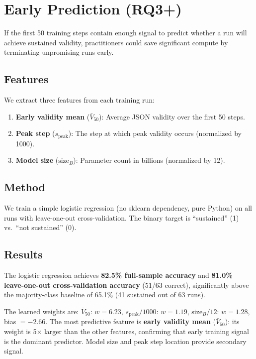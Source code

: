\documentclass[11pt]{article}
\begin{document}
\section{Early Prediction (RQ3+)}
\label{sec:prediction}

If the first 50 training steps contain enough signal to predict whether a run will achieve sustained validity, practitioners could save significant compute by terminating unpromising runs early.

\subsection{Features}

We extract three features from each training run:

\begin{enumerate}[leftmargin=*]
\item \textbf{Early validity mean} ($\bar{V}_{50}$): Average JSON validity over the first 50 steps.
\item \textbf{Peak step} ($s_{\text{peak}}$): The step at which peak validity occurs (normalized by 1000).
\item \textbf{Model size} ($\text{size}_B$): Parameter count in billions (normalized by 12).
\end{enumerate}

\subsection{Method}

We train a simple logistic regression (no sklearn dependency, pure Python) on all runs with leave-one-out cross-validation.  The binary target is ``sustained'' (1) vs.\ ``not sustained'' (0).

\subsection{Results}

The logistic regression achieves \textbf{82.5\% full-sample accuracy} and \textbf{81.0\% leave-one-out cross-validation accuracy} (51/63 correct), significantly above the majority-class baseline of 65.1\% (41 sustained out of 63 runs).

The learned weights are: $\bar{V}_{50}$: $w = 6.23$, $s_{\text{peak}}/1000$: $w = 1.19$, $\text{size}_B/12$: $w = 1.28$, bias $= -2.66$.  The most predictive feature is \textbf{early validity mean} ($\bar{V}_{50}$): its weight is 5$\times$ larger than the other features, confirming that early training signal is the dominant predictor.  Model size and peak step location provide secondary signal.
\end{document}
